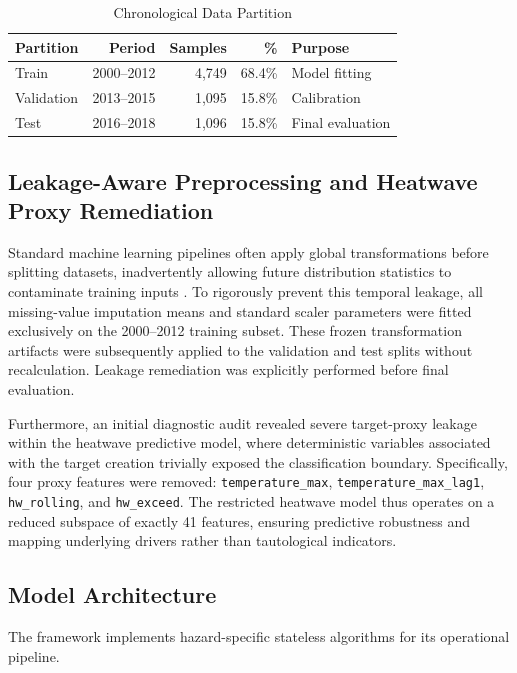 \begin{table}[htbp]
\caption{Chronological Data Partition}
\begin{center}
\begin{tabular}{lrrrl}
\toprule
\textbf{Partition} & \textbf{Period} & \textbf{Samples} & \textbf{\%} & \textbf{Purpose} \\
\midrule
Train & 2000--2012 & 4,749 & 68.4\% & Model fitting \\
Validation & 2013--2015 & 1,095 & 15.8\% & Calibration \\
Test & 2016--2018 & 1,096 & 15.8\% & Final evaluation \\
\bottomrule
\end{tabular}
\label{tab:split}
\end{center}
\end{table}

\subsection{Leakage-Aware Preprocessing and Heatwave Proxy Remediation}
Standard machine learning pipelines often apply global transformations before splitting datasets, inadvertently allowing future distribution statistics to contaminate training inputs \cite{Kaufman2012}. To rigorously prevent this temporal leakage, all missing-value imputation means and standard scaler parameters were fitted exclusively on the 2000--2012 training subset. These frozen transformation artifacts were subsequently applied to the validation and test splits without recalculation. Leakage remediation was explicitly performed before final evaluation.

Furthermore, an initial diagnostic audit revealed severe target-proxy leakage within the heatwave predictive model, where deterministic variables associated with the target creation trivially exposed the classification boundary. Specifically, four proxy features were removed: \texttt{temperature\_max}, \texttt{temperature\_max\_lag1}, \texttt{hw\_rolling}, and \texttt{hw\_exceed}. The restricted heatwave model thus operates on a reduced subspace of exactly 41 features, ensuring predictive robustness and mapping underlying drivers rather than tautological indicators.

\subsection{Model Architecture}
The framework implements hazard-specific stateless algorithms for its operational pipeline.
